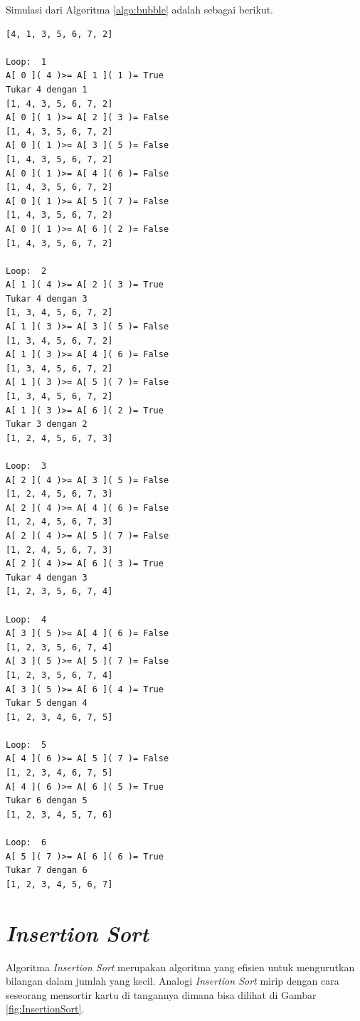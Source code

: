 Simulasi dari Algoritma \ref{algo:bubble} adalah sebagai berikut.
\begin{verbatim}
[4, 1, 3, 5, 6, 7, 2]

Loop:  1
A[ 0 ]( 4 )>= A[ 1 ]( 1 )= True
Tukar 4 dengan 1
[1, 4, 3, 5, 6, 7, 2]
A[ 0 ]( 1 )>= A[ 2 ]( 3 )= False
[1, 4, 3, 5, 6, 7, 2]
A[ 0 ]( 1 )>= A[ 3 ]( 5 )= False
[1, 4, 3, 5, 6, 7, 2]
A[ 0 ]( 1 )>= A[ 4 ]( 6 )= False
[1, 4, 3, 5, 6, 7, 2]
A[ 0 ]( 1 )>= A[ 5 ]( 7 )= False
[1, 4, 3, 5, 6, 7, 2]
A[ 0 ]( 1 )>= A[ 6 ]( 2 )= False
[1, 4, 3, 5, 6, 7, 2]

Loop:  2
A[ 1 ]( 4 )>= A[ 2 ]( 3 )= True
Tukar 4 dengan 3
[1, 3, 4, 5, 6, 7, 2]
A[ 1 ]( 3 )>= A[ 3 ]( 5 )= False
[1, 3, 4, 5, 6, 7, 2]
A[ 1 ]( 3 )>= A[ 4 ]( 6 )= False
[1, 3, 4, 5, 6, 7, 2]
A[ 1 ]( 3 )>= A[ 5 ]( 7 )= False
[1, 3, 4, 5, 6, 7, 2]
A[ 1 ]( 3 )>= A[ 6 ]( 2 )= True
Tukar 3 dengan 2
[1, 2, 4, 5, 6, 7, 3]

Loop:  3
A[ 2 ]( 4 )>= A[ 3 ]( 5 )= False
[1, 2, 4, 5, 6, 7, 3]
A[ 2 ]( 4 )>= A[ 4 ]( 6 )= False
[1, 2, 4, 5, 6, 7, 3]
A[ 2 ]( 4 )>= A[ 5 ]( 7 )= False
[1, 2, 4, 5, 6, 7, 3]
A[ 2 ]( 4 )>= A[ 6 ]( 3 )= True
Tukar 4 dengan 3
[1, 2, 3, 5, 6, 7, 4]

Loop:  4
A[ 3 ]( 5 )>= A[ 4 ]( 6 )= False
[1, 2, 3, 5, 6, 7, 4]
A[ 3 ]( 5 )>= A[ 5 ]( 7 )= False
[1, 2, 3, 5, 6, 7, 4]
A[ 3 ]( 5 )>= A[ 6 ]( 4 )= True
Tukar 5 dengan 4
[1, 2, 3, 4, 6, 7, 5]

Loop:  5
A[ 4 ]( 6 )>= A[ 5 ]( 7 )= False
[1, 2, 3, 4, 6, 7, 5]
A[ 4 ]( 6 )>= A[ 6 ]( 5 )= True
Tukar 6 dengan 5
[1, 2, 3, 4, 5, 7, 6]

Loop:  6
A[ 5 ]( 7 )>= A[ 6 ]( 6 )= True
Tukar 7 dengan 6
[1, 2, 3, 4, 5, 6, 7]
\end{verbatim}
\section{\textit{Insertion Sort}}

Algoritma \textit{Insertion Sort} merupakan algoritma yang efisien untuk mengurutkan bilangan dalam jumlah yang kecil. Analogi \textit{Insertion Sort} mirip dengan cara seseorang mensortir kartu di tangannya dimana bisa dilihat di Gambar \ref{fig:InsertionSort}.

